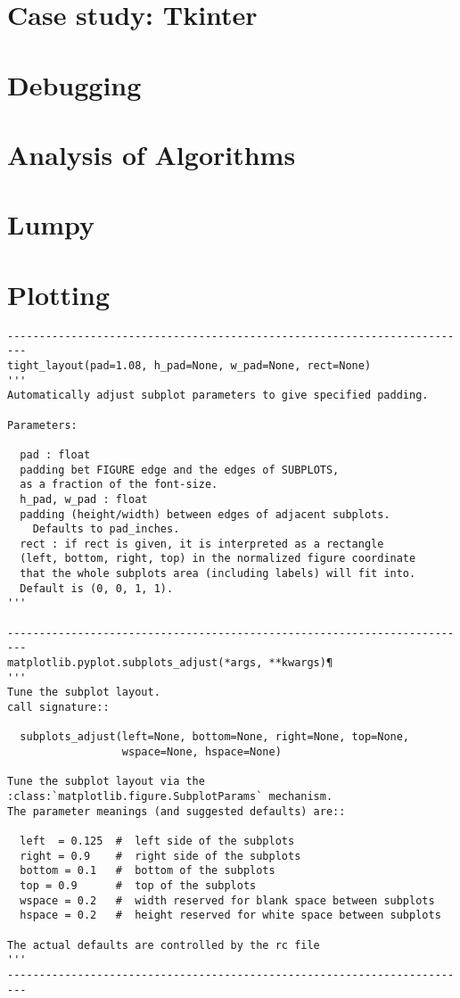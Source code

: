 \documentclass{article}
\begin{document}
\section{Case study: Tkinter}
\newpage%
\section{Debugging}
\newpage%
\section{Analysis of Algorithms}
\newpage%
\section{Lumpy}

\section{Plotting}
\begin{verbatim}
-------------------------------------------------------------------------
tight_layout(pad=1.08, h_pad=None, w_pad=None, rect=None)
'''
Automatically adjust subplot parameters to give specified padding.

Parameters:

  pad : float
  padding bet FIGURE edge and the edges of SUBPLOTS,
  as a fraction of the font-size.
  h_pad, w_pad : float
  padding (height/width) between edges of adjacent subplots.
    Defaults to pad_inches.
  rect : if rect is given, it is interpreted as a rectangle
  (left, bottom, right, top) in the normalized figure coordinate
  that the whole subplots area (including labels) will fit into.
  Default is (0, 0, 1, 1).
'''

-------------------------------------------------------------------------
matplotlib.pyplot.subplots_adjust(*args, **kwargs)¶
'''
Tune the subplot layout.
call signature::

  subplots_adjust(left=None, bottom=None, right=None, top=None,
                  wspace=None, hspace=None)

Tune the subplot layout via the
:class:`matplotlib.figure.SubplotParams` mechanism.
The parameter meanings (and suggested defaults) are::

  left  = 0.125  #  left side of the subplots
  right = 0.9    #  right side of the subplots
  bottom = 0.1   #  bottom of the subplots
  top = 0.9      #  top of the subplots
  wspace = 0.2   #  width reserved for blank space between subplots
  hspace = 0.2   #  height reserved for white space between subplots

The actual defaults are controlled by the rc file
'''
-------------------------------------------------------------------------
\end{verbatim}
\end{document}
